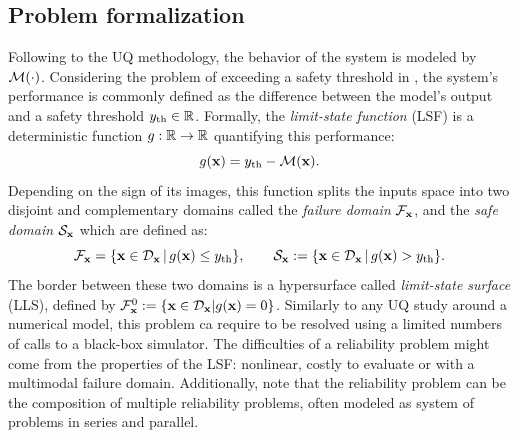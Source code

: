 \subsection{Problem formalization}

Following to the UQ methodology, the behavior of the system is modeled by $\mathcal{M}(\cdot)$. 
Considering the problem of exceeding a safety threshold in , the system's performance is commonly defined as the difference between the model's output and a safety threshold $y_\mathrm{th}\in\mathbb{R}$. 
Formally, the \textit{limit-state function} (LSF) is a deterministic function $g:\mathbb{R}\rightarrow\mathbb{R}$ quantifying this performance: 
\begin{equation}
    g({\bf x}) = y_\mathrm{th} - \mathcal{M}({\bf x}).
\end{equation}
Depending on the sign of its images, this function splits the inputs space into two disjoint and complementary domains called  
the \textit{failure domain} $\mathcal{F}_{{\bf x}}$, and the \textit{safe domain} $\mathcal{S}_{\bf x}$ which are defined as:
\begin{equation}
    \mathcal{F}_{{\bf x}} = \{{\bf x} \in \mathcal{D}_{\bf x} \, | \,  g({\bf x}) \leq y_\mathrm{th}\}, \qquad 
    \mathcal{S}_{\bf x} := \{{\bf x} \in \mathcal{D}_{\bf x} \, | \, g({\bf x}) > y_\mathrm{th}\}. 
\end{equation}
The border between these two domains is a hypersurface called \textit{limit-state surface} (LLS), defined by $\mathcal{F}_{{\bf x}}^0 := \{{\bf x} \in \mathcal{D}_{\bf x} | g({\bf x}) = 0\}$.
Similarly to any UQ study around a numerical model, this problem ca require to be resolved using a limited numbers of calls to a black-box simulator.
The difficulties of a reliability problem might come from the properties of the LSF: nonlinear, costly to evaluate or with a multimodal failure domain. 
Additionally, note that the reliability problem can be the composition of multiple reliability problems, often modeled as system of problems in series and parallel.

